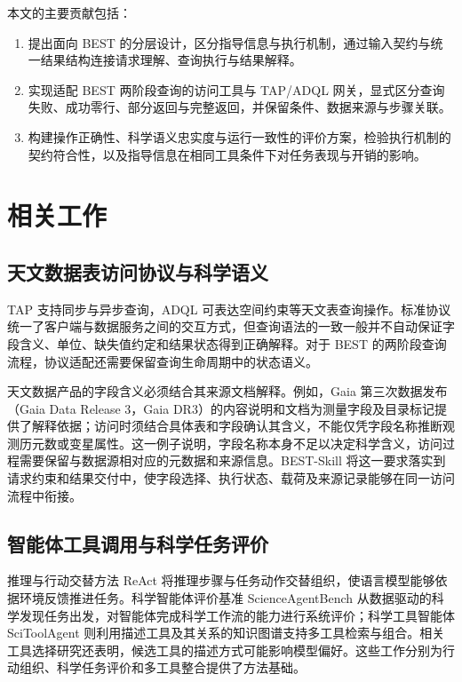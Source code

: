 \documentclass{dcfp}
\begin{document}
\begin{PaperBody}
本文的主要贡献包括：
\begin{enumerate}
\item 提出面向 BEST 的分层设计，区分指导信息与执行机制，通过输入契约与统一结果结构连接请求理解、查询执行与结果解释。
\item 实现适配 BEST 两阶段查询的访问工具与 TAP/ADQL 网关，显式区分查询失败、成功零行、部分返回与完整返回，并保留条件、数据来源与步骤关联。
\item 构建操作正确性、科学语义忠实度与运行一致性的评价方案，检验执行机制的契约符合性，以及指导信息在相同工具条件下对任务表现与开销的影响。
\end{enumerate}

\section{相关工作}

\subsection{天文数据表访问协议与科学语义}

TAP 支持同步与异步查询，ADQL 可表达空间约束等天文表查询操作\citep{ref6,ref13}。标准协议统一了客户端与数据服务之间的交互方式，但查询语法的一致一般并不自动保证字段含义、单位、缺失值约定和结果状态得到正确解释。对于 BEST 的两阶段查询流程，协议适配还需要保留查询生命周期中的状态语义。

天文数据产品的字段含义必须结合其来源文档解释。例如，Gaia 第三次数据发布（Gaia Data Release 3，Gaia DR3）的内容说明和文档为测量字段及目录标记提供了解释依据；访问时须结合具体表和字段确认其含义，不能仅凭字段名称推断观测历元数或变星属性\citep{ref8,ref9}。这一例子说明，字段名称本身不足以决定科学含义，访问过程需要保留与数据源相对应的元数据和来源信息。BEST-Skill 将这一要求落实到请求约束和结果交付中，使字段选择、执行状态、载荷及来源记录能够在同一访问流程中衔接。

\subsection{智能体工具调用与科学任务评价}

推理与行动交替方法 ReAct 将推理步骤与任务动作交替组织，使语言模型能够依据环境反馈推进任务\citep{ref10}。科学智能体评价基准 ScienceAgentBench 从数据驱动的科学发现任务出发，对智能体完成科学工作流的能力进行系统评价\citep{ref11}；科学工具智能体 SciToolAgent 则利用描述工具及其关系的知识图谱支持多工具检索与组合\citep{ref12}。相关工具选择研究还表明，候选工具的描述方式可能影响模型偏好\citep{ref7}。这些工作分别为行动组织、科学任务评价和多工具整合提供了方法基础。


\end{PaperBody}
\end{document}
